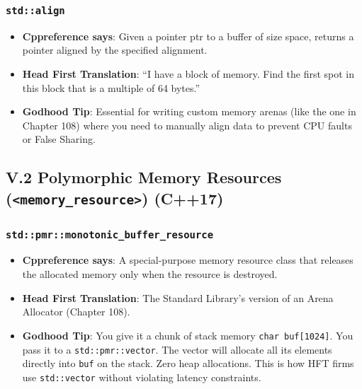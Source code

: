 \hypertarget{stdalign}{%
\subsubsection{\texorpdfstring{\texttt{std::align}}{std::align}}\label{stdalign}}

\begin{itemize}
\tightlist
\item
  \textbf{Cppreference says}: Given a pointer ptr to a buffer of size
  space, returns a pointer aligned by the specified alignment.
\item
  \textbf{Head First Translation}: ``I have a block of memory. Find the
  first spot in this block that is a multiple of 64 bytes.''
\item
  \textbf{Godhood Tip}: Essential for writing custom memory arenas (like
  the one in Chapter 108) where you need to manually align data to
  prevent CPU faults or False Sharing.
\end{itemize}

\hypertarget{v.2-polymorphic-memory-resources-memory_resource-c17}{%
\subsection{\texorpdfstring{V.2 Polymorphic Memory Resources
(\texttt{\textless{}memory\_resource\textgreater{}})
(C++17)}{V.2 Polymorphic Memory Resources (\textless memory\_resource\textgreater) (C++17)}}\label{v.2-polymorphic-memory-resources-memory_resource-c17}}

\hypertarget{stdpmrmonotonic_buffer_resource}{%
\subsubsection{\texorpdfstring{\texttt{std::pmr::monotonic\_buffer\_resource}}{std::pmr::monotonic\_buffer\_resource}}\label{stdpmrmonotonic_buffer_resource}}

\begin{itemize}
\tightlist
\item
  \textbf{Cppreference says}: A special-purpose memory resource class
  that releases the allocated memory only when the resource is
  destroyed.
\item
  \textbf{Head First Translation}: The Standard Library's version of an
  Arena Allocator (Chapter 108).
\item
  \textbf{Godhood Tip}: You give it a chunk of stack memory
  \passthrough{\lstinline!char buf[1024]!}. You pass it to a
  \passthrough{\lstinline!std::pmr::vector!}. The vector will allocate
  all its elements directly into \passthrough{\lstinline!buf!} on the
  stack. Zero heap allocations. This is how HFT firms use
  \passthrough{\lstinline!std::vector!} without violating latency
  constraints.
\end{itemize}


